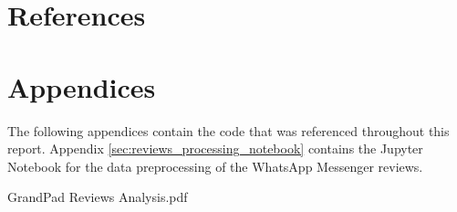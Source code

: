 \documentclass[12pt]{article}
\begin{document}
    \setlength\fboxsep{5pt}
    \setlength{\fboxrule}{1pt}
    \restoregeometry

    \markboth{}{}
    {\hypersetup{linkcolor=black}
        \tableofcontents
        \thispagestyle{fancy}
    }
    \markboth{}{}

    \pagebreak

    

    

    \fancyhead{}

    \part*{References}
    \begingroup
        \def\section*#1{}
        
        
    \endgroup

    \pagebreak

    \part*{Appendices}
        \begin{appendices}
            The following appendices contain the code that was referenced
                throughout this report.
            Appendix \ref{sec:reviews_processing_notebook} contains the Jupyter
                Notebook for the data preprocessing of the WhatsApp Messenger
                reviews.

            
            {GrandPad Reviews Analysis.pdf}
        \end{appendices}
\end{document}

